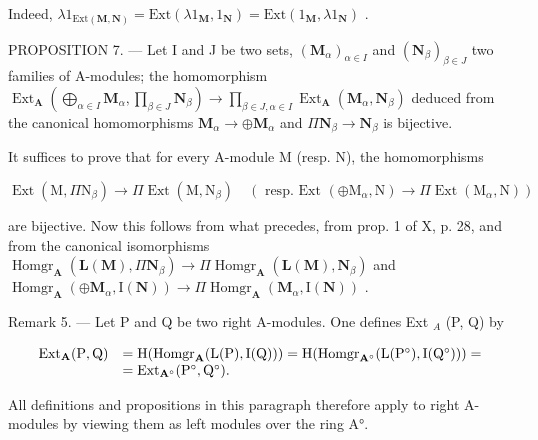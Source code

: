 Indeed, \(\lambda 1_{\mathrm{Ext}(\mathbf{M},\mathbf{N})} = \mathrm{Ext}(\lambda 1_{\mathbf{M}},1_{\mathbf{N}}) = \mathrm{Ext}(1_{\mathbf{M}},\lambda 1_{\mathbf{N}})\) .

PROPOSITION 7. --- Let I and J be two sets, \((\mathbf{M}_{\alpha})_{\alpha \in I}\) and \((\mathbf{N}_{\beta})_{\beta \in J}\) two families of A-modules; the homomorphism \(\operatorname{Ext}_{\mathbf{A}}\left(\bigoplus_{\alpha \in I} \mathbf{M}_{\alpha}, \prod_{\beta \in J} \mathbf{N}_{\beta}\right) \to \prod_{\beta \in J, \alpha \in I} \operatorname{Ext}_{\mathbf{A}}(\mathbf{M}_{\alpha}, \mathbf{N}_{\beta})\) deduced from the canonical homomorphisms \(\mathbf{M}_{\alpha} \to \oplus \mathbf{M}_{\alpha}\) and \(\Pi \mathbf{N}_{\beta} \to \mathbf{N}_{\beta}\) is bijective.

It suffices to prove that for every A-module M (resp. N), the homomorphisms

\[
\operatorname{Ext} \left(\mathrm{M}, \Pi \mathrm{N} _ {\beta}\right)\rightarrow \Pi \operatorname{Ext} \left(\mathrm{M}, \mathrm{N} _ {\beta}\right) \quad (\text { resp.   Ext } (\oplus \mathrm{M} _ {\alpha}, \mathrm{N}) \rightarrow \Pi \operatorname{Ext} \left(\mathrm{M} _ {\alpha}, \mathrm{N}\right))
\]

are bijective. Now this follows from what precedes, from prop. 1 of X, p. 28, and from the canonical isomorphisms \(\operatorname{Homgr}_{\mathbf{A}}(\mathbf{L}(\mathbf{M}), \Pi \mathbf{N}_{\beta}) \to \Pi \operatorname{Homgr}_{\mathbf{A}}(\mathbf{L}(\mathbf{M}), \mathbf{N}_{\beta})\) and \(\operatorname{Homgr}_{\mathbf{A}}(\oplus \mathbf{M}_{\alpha}, \mathrm{I}(\mathbf{N})) \to \Pi \operatorname{Homgr}_{\mathbf{A}}(\mathbf{M}_{\alpha}, \mathrm{I}(\mathbf{N}))\) .

Remark 5. --- Let P and Q be two right A-modules. One defines Ext \(_{A}\) (P, Q) by

\[
\begin{array}{r l} \operatorname{Ext} _ {\mathbf {A}} (\mathrm{P}, \mathrm{Q}) & = \mathrm{H} (\operatorname{Homgr} _ {\mathbf {A}} (\mathrm{L} (\mathrm{P}), \mathrm{I} (\mathrm{Q}))) = \mathrm{H} (\operatorname{Homgr} _ {\mathbf {A} ^ {\circ}} (\mathrm{L} (\mathrm{P} ^ {\circ}), \mathrm{I} (\mathrm{Q} ^ {\circ}))) = \\ & = \operatorname{Ext} _ {\mathbf {A} ^ {\circ}} (\mathrm{P} ^ {\circ}, \mathrm{Q} ^ {\circ}). \end{array}
\]

All definitions and propositions in this paragraph therefore apply to right A-modules by viewing them as left modules over the ring A°.

